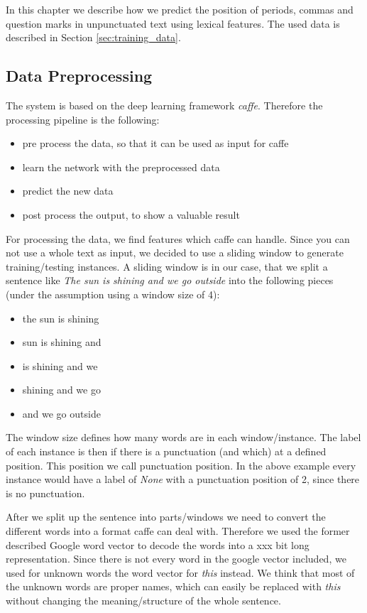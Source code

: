 In this chapter we describe how we predict the position of periods, commas and question marks in unpunctuated text using lexical features.
The used data is described in Section \ref{sec:training_data}. 

\subsection{Data Preprocessing}
The system is based on the deep learning framework \emph{caffe}.
Therefore the processing pipeline is the following:

\begin{itemize}
\item pre process the data, so that it can be used as input for caffe
\item learn the network with the preprocessed data
\item predict the new data
\item post process the output, to show a valuable result
\end{itemize}

For processing the data, we find features which caffe can handle. 
Since you can not use a whole text as input, we decided to use a sliding window to generate training/testing instances.
A sliding window is in our case, that we split a sentence like \emph{The sun is shining and we go outside} into the following pieces (under the assumption using a window size of 4):
\begin{itemize}
\item the sun is shining
\item sun is shining and
\item is shining and we
\item shining and we go
\item and we go outside
\end{itemize}

The window size defines how many words are in each window/instance.
The label of each instance is then if there is a punctuation (and which) at a defined position. 
This position we call punctuation position.
In the above example every instance would have a label of \emph{None} with a punctuation position of 2, since there is no punctuation.

After we split up the sentence into parts/windows we need to convert the different words into a format caffe can deal with.
Therefore we used the former described Google word vector to decode the words into a xxx bit long representation. 
Since there is not every word in the google vector included, we used for unknown words the word vector for \emph{this} instead. 
We think that most of the unknown words are proper names, which can easily be replaced with \emph{this} without changing the meaning/structure of the whole sentence.

